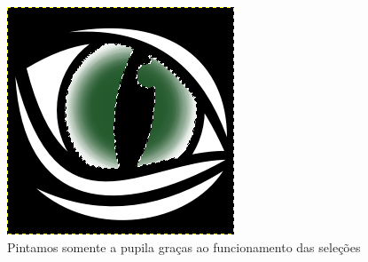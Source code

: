 \documentclass[12pt,onecolumn]{article}
\begin{document}
    \begin{figure}[H]
      \centering
      \includegraphics[width=.5\textwidth]{screenshots/04-pupil.png}
      \caption{Pintamos somente a pupila graças ao funcionamento das seleções}
      \label{fig:pupil}
    \end{figure}
        
\end{document}
